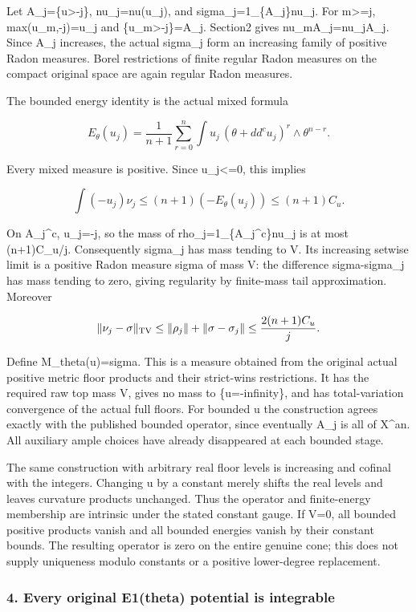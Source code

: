 \documentclass[
]{article}
\begin{document}
Let A\_j=\{u\textgreater-j\}, nu\_j=nu(u\_j), and
sigma\_j=1\_\{A\_j\}nu\_j. For m\textgreater=j, max(u\_m,-j)=u\_j and
\{u\_m\textgreater-j\}=A\_j. Section2 gives
nu\_m\textbar A\_j=nu\_j\textbar A\_j. Since A\_j increases, the actual
sigma\_j form an increasing family of positive Radon measures. Borel
restrictions of finite regular Radon measures on the compact original
space are again regular Radon measures.

The bounded energy identity is the actual mixed formula

\[E_\theta(u_j)=\frac1{n+1}\sum_{r=0}^n
\int u_j\,(\theta+dd^cu_j)^r\wedge\theta^{n-r}.\]

Every mixed measure is positive. Since u\_j\textless=0, this implies

\[\int(-u_j)\nu_j\leq(n+1)(-E_\theta(u_j))\leq(n+1)C_u.\]

On A\_j\^{}c, u\_j=-j, so the mass of rho\_j=1\_\{A\_j\^{}c\}nu\_j is at
most (n+1)C\_u/j. Consequently sigma\_j has mass tending to V. Its
increasing setwise limit is a positive Radon measure sigma of mass V:
the difference sigma-sigma\_j has mass tending to zero, giving
regularity by finite-mass tail approximation. Moreover

\[\|\nu_j-\sigma\|_{\rm TV}\leq
\|\rho_j\|+\|\sigma-\sigma_j\|
\leq\frac{2(n+1)C_u}{j}.\]

Define M\_theta(u)=sigma. This is a measure obtained from the original
actual positive metric floor products and their strict-wins
restrictions. It has the required raw top mass V, gives no mass to
\{u=-infinity\}, and has total-variation convergence of the actual full
floors. For bounded u the construction agrees exactly with the published
bounded operator, since eventually A\_j is all of X\^{}an. All auxiliary
ample choices have already disappeared at each bounded stage.

The same construction with arbitrary real floor levels is increasing and
cofinal with the integers. Changing u by a constant merely shifts the
real levels and leaves curvature products unchanged. Thus the operator
and finite-energy membership are intrinsic under the stated constant
gauge. If V=0, all bounded positive products vanish and all bounded
energies vanish by their constant bounds. The resulting operator is zero
on the entire genuine cone; this does not supply uniqueness modulo
constants or a positive lower-degree replacement.

\subsubsection{4. Every original E1(theta) potential is
integrable}\label{every-original-e1theta-potential-is-integrable}
\end{document}
